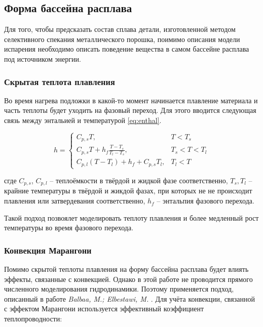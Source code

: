
\subsection{Форма бассейна расплава}

Для того, чтобы предсказать состав сплава детали, изготовленной методом селективного спекания металлического порошка, поимимо описания модели испарения необходимо описать поведение вещества в самом бассейне расплава под источником энергии. 

\subsubsection{Скрытая теплота плавления}

Во время нагрева подложки в какой-то момент начинается плавление материала и часть теплоты будет уходить на фазовый переход. Для этого вводится следующая связь между энтальией и температурой \cite{hu1996mathematical} \ref{eq:enthal}.

\begin{equation}
    \label{eq:enthal}
h=
\begin{cases}
    C_{p,s}T, & T<T_s \\
    C_{p,s}T + h_f\frac{T-T_s}{T_l-T_s}, & T_s <T<T_l \\
    C_{p,l}(T-T_l) + h_f + C_{p,s}T_l, & T_l < T
\end{cases}
\end{equation}

сгде $C_{p,s}$, $C_{p,l}$ -- теплоёмкости в твёрдой и жидкой фазе соответственно, $T_s, T_l$ -- крайние температуры в твёрдой и жикдой фазах, при которых не не происходит плавления или затвердевания соответственно, $h_f$  -- энтальпия фазового перехода.


Такой подход позвоялет моделировать теплоту плавления и более медленный рост температуры во время фазового перехода.

\subsubsection{Конвекция Марангони}

Помимо скрытой теплоты плавления на форму бассейна расплава будет влиять эффекты, связанные с конвекцией. Однако в этой работе не проводится прямого численного моделирования гидродинамики. Поэтому применяется подход, описанный в работе 
\textit{Balbaa, M.; Elbestawi, M.} 
\cite{balbaa2022multi}.
Для учёта конвекции, связанной с эффектом Марангони используется эффективный коэффициент теплопроводности:


